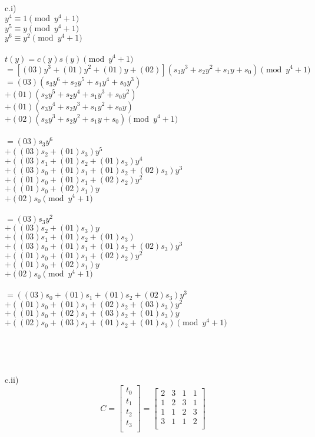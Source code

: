 \documentclass{assignment}
\begin{document}
\begin{problemlist}
\begin{problem}
\begin{answer}
c.i)\\
$y^4\equiv 1 \pmod {y^4+1}$\\
$y^5\equiv y \pmod {y^4+1}$\\
$y^6\equiv y^2 \pmod {y^4+1}$\\
\\
$t(y)=c(y)s(y) \pmod {y^4+1}$\\
$=[(03)y^3+(01)y^2+(01)y+(02)](s_3y^3+s_2y^2+s_1y+s_0) \pmod {y^4+1}$\\
$=(03)(s_3y^6+s_2y^5+s_1y^4+s_0y^3)$\\
$+(01)(s_3y^5+s_2y^4+s_1y^3+s_0y^2)$\\
$+(01)(s_3y^4+s_2y^3+s_1y^2+s_0y)$\\
$+(02)(s_3y^3+s_2y^2+s_1y+s_0) \pmod {y^4+1}$\\
\\
$=(03)s_3y^6$\\
$+((03)s_2+(01)s_3)y^5$\\
$+((03)s_1+(01)s_2+(01)s_3)y^4$\\
$+((03)s_0+(01)s_1+(01)s_2+(02)s_3)y^3$\\
$+((01)s_0+(01)s_1+(02)s_2)y^2$\\
$+((01)s_0+(02)s_1)y$\\
$+(02)s_0 \pmod {y^4+1}$\\
\\
$=(03)s_3y^2$\\
$+((03)s_2+(01)s_3)y$\\
$+((03)s_1+(01)s_2+(01)s_3)$\\
$+((03)s_0+(01)s_1+(01)s_2+(02)s_3)y^3$\\
$+((01)s_0+(01)s_1+(02)s_2)y^2$\\
$+((01)s_0+(02)s_1)y$\\
$+(02)s_0 \pmod {y^4+1}$\\
\\
$=((03)s_0+(01)s_1+(01)s_2+(02)s_3)y^3$\\
$+((01)s_0+(01)s_1+(02)s_2+(03)s_3)y^2$\\
$+((01)s_0+(02)s_1+(03)s_2+(01)s_3)y$\\
$+((02)s_0+(03)s_1+(01)s_2+(01)s_3) \pmod {y^4+1}$\\
\\
\\
\\
\\
c.ii)\\
\[
C=
\begin{bmatrix}
t_0\\
t_1\\
t_2\\
t_3\\
\end{bmatrix}
=
\begin{bmatrix}
2 & 3 & 1 & 1\\
1 & 2 & 3 & 1\\
1 & 1 & 2 & 3\\
3 & 1 & 1 & 2 \\
\end{bmatrix}
\]
\\
\end{answer}
\end{problem}


\end{problemlist}
\end{document}
